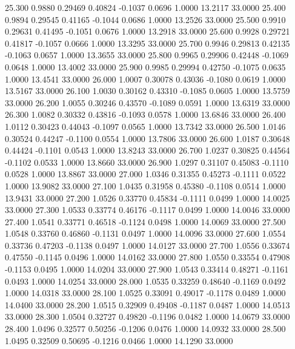   25.300   0.9880   0.29469   0.40824  -0.1037   0.0696   1.0000  13.2117  33.0000
  25.400   0.9894   0.29545   0.41165  -0.1044   0.0686   1.0000  13.2526  33.0000
  25.500   0.9910   0.29631   0.41495  -0.1051   0.0676   1.0000  13.2918  33.0000
  25.600   0.9928   0.29721   0.41817  -0.1057   0.0666   1.0000  13.3295  33.0000
  25.700   0.9946   0.29813   0.42135  -0.1063   0.0657   1.0000  13.3655  33.0000
  25.800   0.9965   0.29906   0.42448  -0.1069   0.0648   1.0000  13.4002  33.0000
  25.900   0.9985   0.29994   0.42750  -0.1075   0.0635   1.0000  13.4541  33.0000
  26.000   1.0007   0.30078   0.43036  -0.1080   0.0619   1.0000  13.5167  33.0000
  26.100   1.0030   0.30162   0.43310  -0.1085   0.0605   1.0000  13.5759  33.0000
  26.200   1.0055   0.30246   0.43570  -0.1089   0.0591   1.0000  13.6319  33.0000
  26.300   1.0082   0.30332   0.43816  -0.1093   0.0578   1.0000  13.6846  33.0000
  26.400   1.0112   0.30423   0.44043  -0.1097   0.0565   1.0000  13.7342  33.0000
  26.500   1.0146   0.30524   0.44247  -0.1100   0.0554   1.0000  13.7806  33.0000
  26.600   1.0187   0.30648   0.44424  -0.1101   0.0543   1.0000  13.8243  33.0000
  26.700   1.0237   0.30825   0.44564  -0.1102   0.0533   1.0000  13.8660  33.0000
  26.900   1.0297   0.31107   0.45083  -0.1110   0.0528   1.0000  13.8867  33.0000
  27.000   1.0346   0.31355   0.45273  -0.1111   0.0522   1.0000  13.9082  33.0000
  27.100   1.0435   0.31958   0.45380  -0.1108   0.0514   1.0000  13.9431  33.0000
  27.200   1.0526   0.33770   0.45834  -0.1111   0.0499   1.0000  14.0025  33.0000
  27.300   1.0533   0.33774   0.46176  -0.1117   0.0499   1.0000  14.0046  33.0000
  27.400   1.0541   0.33771   0.46518  -0.1124   0.0498   1.0000  14.0069  33.0000
  27.500   1.0548   0.33760   0.46860  -0.1131   0.0497   1.0000  14.0096  33.0000
  27.600   1.0554   0.33736   0.47203  -0.1138   0.0497   1.0000  14.0127  33.0000
  27.700   1.0556   0.33674   0.47550  -0.1145   0.0496   1.0000  14.0162  33.0000
  27.800   1.0550   0.33554   0.47908  -0.1153   0.0495   1.0000  14.0204  33.0000
  27.900   1.0543   0.33414   0.48271  -0.1161   0.0493   1.0000  14.0254  33.0000
  28.000   1.0535   0.33259   0.48640  -0.1169   0.0492   1.0000  14.0318  33.0000
  28.100   1.0525   0.33091   0.49017  -0.1178   0.0489   1.0000  14.0400  33.0000
  28.200   1.0515   0.32909   0.49408  -0.1187   0.0487   1.0000  14.0513  33.0000
  28.300   1.0504   0.32727   0.49820  -0.1196   0.0482   1.0000  14.0679  33.0000
  28.400   1.0496   0.32577   0.50256  -0.1206   0.0476   1.0000  14.0932  33.0000
  28.500   1.0495   0.32509   0.50695  -0.1216   0.0466   1.0000  14.1290  33.0000
